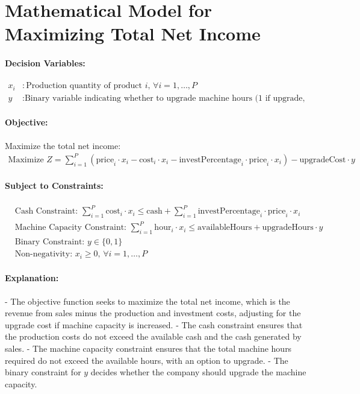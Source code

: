\documentclass{article}
\begin{document}
\section*{Mathematical Model for Maximizing Total Net Income}

\paragraph{Decision Variables:}
\begin{align*}
    x_i & : \text{Production quantity of product } i, \, \forall i = 1, \ldots, P \\
    y & : \text{Binary variable indicating whether to upgrade machine hours (1 if upgrade, 0 otherwise)}
\end{align*}

\paragraph{Objective:}
Maximize the total net income:
\begin{align*}
    \text{Maximize } Z = \sum_{i=1}^{P} \left( \text{price}_i \cdot x_i - \text{cost}_i \cdot x_i - \text{investPercentage}_i \cdot \text{price}_i \cdot x_i \right) - \text{upgradeCost} \cdot y
\end{align*}

\paragraph{Subject to Constraints:}
\begin{align*}
    & \text{Cash Constraint: } \sum_{i=1}^{P} \text{cost}_i \cdot x_i \leq \text{cash} + \sum_{i=1}^{P} \text{investPercentage}_i \cdot \text{price}_i \cdot x_i \\
    & \text{Machine Capacity Constraint: } \sum_{i=1}^{P} \text{hour}_i \cdot x_i \leq \text{availableHours} + \text{upgradeHours} \cdot y \\
    & \text{Binary Constraint: } y \in \{0, 1\} \\
    & \text{Non-negativity: } x_i \geq 0, \, \forall i = 1, \ldots, P
\end{align*}

\paragraph{Explanation:}
- The objective function seeks to maximize the total net income, which is the revenue from sales minus the production and investment costs, adjusting for the upgrade cost if machine capacity is increased.
- The cash constraint ensures that the production costs do not exceed the available cash and the cash generated by sales.
- The machine capacity constraint ensures that the total machine hours required do not exceed the available hours, with an option to upgrade.
- The binary constraint for \( y \) decides whether the company should upgrade the machine capacity.
\end{document}
